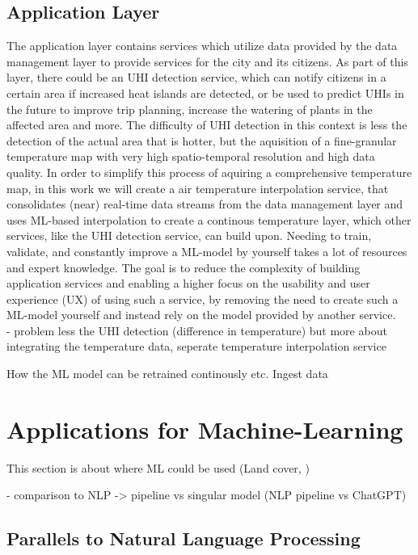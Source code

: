 \subsection{Application Layer}

The application layer contains services which utilize data provided by the data management layer to provide services for the city and its citizens. As part of this layer, there could be an UHI detection service, which can notify citizens in a certain area if increased heat islands are detected, or be used to predict UHIs in the future to improve trip planning, increase the watering of plants in the affected area and more.
The difficulty of UHI detection in this context is less the detection of the actual area that is hotter, but the aquisition of a fine-granular temperature map with very high spatio-temporal resolution and high data quality. In order to simplify this process of aquiring a comprehensive temperature map, in this work we will create a air temperature interpolation service, that consolidates (near) real-time data streams from the data management layer and uses ML-based interpolation to create a continous temperature layer, which other services, like the UHI detection service, can build upon. Needing to train, validate, and constantly improve a ML-model by yourself takes a lot of resources and expert knowledge. The goal is to reduce the complexity of building application services and enabling a higher focus on the usability and user experience (UX) of using such a service, by removing the need to create such a ML-model yourself and instead rely on the model provided by another service.\\

- problem less the UHI detection (difference in temperature) but more about integrating the temperature data, seperate temperature interpolation service

How the ML model can be retrained continously etc.
Ingest data

\section{Applications for Machine-Learning}

This section is about where ML could be used (Land cover, )

- comparison to NLP -> pipeline vs singular model (NLP pipeline vs ChatGPT)

\subsection{Parallels to Natural Language Processing}

